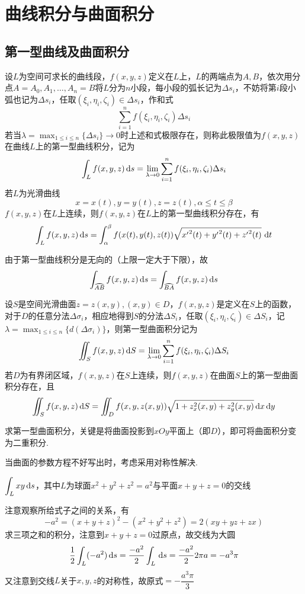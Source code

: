 
\section{曲线积分与曲面积分}
\subsection{第一型曲线及曲面积分}
\begin{definition}[第一型曲线积分]
设$L$为空间可求长的曲线段，$f(x,y,z)$定义在$L$上，$L$的两端点为$A,B$，依次用分点$A=A_0,A_1,\ldots,A_n=B$将$L$分为$n$小段，每小段的弧长记为$\Delta s_i$，不妨将第$i$段小弧也记为$\Delta s_i$，任取$(\xi_i,\eta_i,\zeta_i)\in\Delta s_i$，作和式
\[\sum_{i=1}^n f(\xi_i,\eta_i,\zeta_i)\Delta s_i\]
若当$\lambda=\max_{1\leq i\leq n}\{\Delta s_i\}\to 0$时上述和式极限存在，则称此极限值为$f(x,y,z)$在曲线$L$上的第一型曲线积分，记为
\[\int_Lf(x,y,z)\,\mathrm{d} s=\lim_{\lambda\to 0}\sum_{i=1}^nf(\xi_i,\eta_i,\zeta_i)\Delta s_i\]
若$L$为光滑曲线
\[x=x(t),y=y(t),z=z(t),\alpha\leq t\leq\beta\]
$f(x,y,z)$在$L$上连续，则$f(x,y,z)$在$L$上的第一型曲线积分存在，有
\[\int_Lf(x,y,z)\,\mathrm{d} s=\displaystyle\int_{\alpha}^{\beta}{f(x(t),y(t),z(t))\sqrt{{x'}^2(t)+{y'}^2(t)+{z'}^2(t)}}\,\,\mathrm{d} t\]
\end{definition}
由于第一型曲线积分是无向的（上限一定大于下限），故
\[\int_{\wideparen{AB}}f(x,y,z)\diff s=\int_{\wideparen{BA}}f(x,y,z)\diff s\]
\begin{definition}[第一型曲面积分]
设$S$是空间光滑曲面$z=z(x,y),(x,y)\in D$，$f(x,y,z)$是定义在$S$上的函数，对于$D$的任意分法$\Delta\sigma_i$，相应地得到$S$的分法$\Delta S_i$，任取$(\xi_i,\eta_i,\zeta_i)\in\Delta S_i$，记$\lambda=\max_{1\leq i\leq n}\{d(\Delta\sigma_i)\}$，则第一型曲面积分记为
\[\iint_S f(x,y,z)\,\mathrm{d} S=\lim_{\lambda\to 0}\sum_{i=1}^n f(\xi_i,\eta_i,\zeta_i)\Delta S_i\]
若$D$为有界闭区域，$f(x,y,z)$在$S$上连续，则$f(x,y,z)$在曲面$S$上的第一型曲面积分存在，且
\[\iint_S f(x,y,z)\,\mathrm{d} S=\iint_D f(x,y,z(x,y))\sqrt{1+z_x^2(x,y)+z_y^2(x,y)}\,\mathrm{d} x\,\mathrm{d} y\]
\end{definition}
求第一型曲面积分，关键是将曲面投影到$xOy$平面上（即$D$），即可将曲面积分变为二重积分.
\par 当曲面的参数方程不好写出时，考虑采用对称性解决.
\begin{example}
$\displaystyle\int_Lxy\,\mathrm{d} s$，其中$L$为球面$x^2+y^2+z^2=a^2$与平面$x+y+z=0$的交线
\end{example}
\begin{analysis}
注意观察所给式子之间的关系，有
\[-a^2=(x+y+z)^2-(x^2+y^2+z^2)=2(xy+yz+zx)\]
求三项之和的积分，注意到$x+y+z=0$过原点，故交线为大圆
\[\frac{1}{2}\int_L(-a^2)\,\mathrm{d} s=\frac{-a^2}{2}\int_L\,\mathrm{d} s=\frac{-a^2}{2}2\pi a=-a^3\pi\]
又注意到交线$L$关于$x,y,z$的对称性，故原式$=-\dfrac{a^3\pi}{3}$
\end{analysis}

